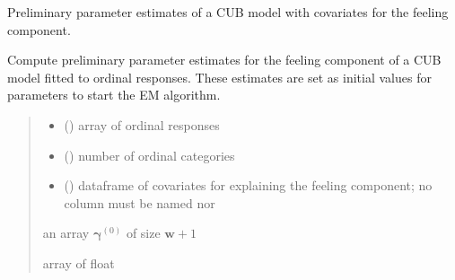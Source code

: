 \documentclass[letterpaper,10pt,english]{sphinxmanual}
\begin{document}

\begin{fulllineitems}
\label{\detokenize{cubmods:cubmods.cub_0w.init_gamma}}
\pysigstartsignatures
{}
\pysigstopsignatures
\sphinxAtStartPar
Preliminary parameter estimates of a CUB model with covariates for the feeling component.

\sphinxAtStartPar
Compute preliminary parameter estimates for the feeling component of a CUB model 
fitted to ordinal responses.
These estimates are set as initial values for parameters to start the E\sphinxhyphen{}M algorithm.
\begin{quote}\begin{description}
\begin{itemize}
\item {} 
\sphinxAtStartPar
{} () \textendash{} array of ordinal responses

\item {} 
\sphinxAtStartPar
{} () \textendash{} number of ordinal categories

\item {} 
\sphinxAtStartPar
{} () \textendash{} dataframe of covariates for explaining the feeling component;
no column must be named  nor 

\end{itemize}

\sphinxAtStartPar
an array \(\pmb\gamma^{(0)}\) of size \(\pmb w + 1\)

\sphinxAtStartPar
array of float

\end{description}\end{quote}

\end{fulllineitems}

\end{document}
